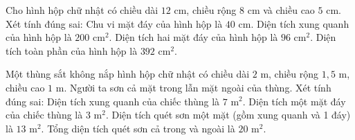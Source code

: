 \begin{ex} %
Cho hình hộp chữ nhật có chiều dài $12\text{ cm}$, chiều rộng $8\text{ cm}$ và chiều cao $5\text{ cm}$. Xét tính đúng sai:
\choiceTF
{\True Chu vi mặt đáy của hình hộp là $40\text{ cm}$.}
{\True Diện tích xung quanh của hình hộp là $200\text{ cm}^2$.}
{Diện tích hai mặt đáy của hình hộp là $96\text{ cm}^2$.}
{\True Diện tích toàn phần của hình hộp là $392\text{ cm}^2$.}
\end{ex}

\begin{ex} %
Một thùng sắt không nắp hình hộp chữ nhật có chiều dài $2\text{ m}$, chiều rộng $1{,}5\text{ m}$, chiều cao $1\text{ m}$. Người ta sơn cả mặt trong lẫn mặt ngoài của thùng. Xét tính đúng sai:
\choiceTF
{\True Diện tích xung quanh của chiếc thùng là $7\text{ m}^2$.}
{\True Diện tích một mặt đáy của chiếc thùng là $3\text{ m}^2$.}
{Diện tích quét sơn một mặt (gồm xung quanh và 1 đáy) là $13\text{ m}^2$.}
{\True Tổng diện tích quét sơn cả trong và ngoài là $20\text{ m}^2$.}
\end{ex}

